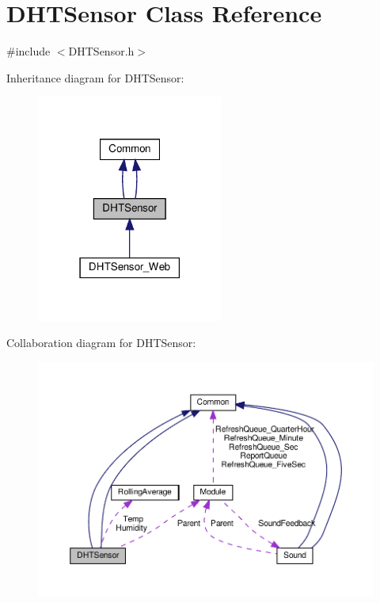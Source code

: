 \hypertarget{class_d_h_t_sensor}{}\section{D\+H\+T\+Sensor Class Reference}
\label{class_d_h_t_sensor}


{\ttfamily \#include $<$D\+H\+T\+Sensor.\+h$>$}



Inheritance diagram for D\+H\+T\+Sensor\+:
\nopagebreak
\begin{figure}[H]
\begin{center}
\leavevmode
\includegraphics[width=174pt]{class_d_h_t_sensor__inherit__graph}
\end{center}
\end{figure}


Collaboration diagram for D\+H\+T\+Sensor\+:
\nopagebreak
\begin{figure}[H]
\begin{center}
\leavevmode
\includegraphics[width=350pt]{class_d_h_t_sensor__coll__graph}
\end{center}
\end{figure}
